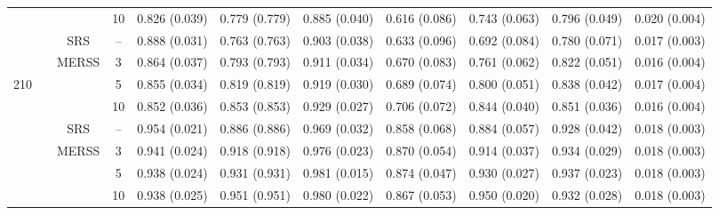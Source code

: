 \documentclass[twoside]{article}
\begin{document}
\begin{table}[!htb]
{\begin{tabular}{c c c c c c c c c c c}
    &                      &                                          &  10   &
  0.826 (0.039) & 0.779 (0.779) & 0.885 (0.040) & 0.616 (0.086) & 0.743 (0.063) & 0.796 (0.049)& 0.020 (0.004)  \\

    
 \cmidrule(lr){2-11}
  &\multirow{9}{*}{ }  & 
   \multirow{1}{*}{SRS} & -- 
 &0.888 (0.031) & 0.763 (0.763) & 0.903 (0.038) & 0.633 (0.096) & 0.692 (0.084) & 0.780 (0.071)& 0.017 (0.003)  \\
    
    \cmidrule(lr){3-11}
    &                      & \multirow{3}{*}{MERSS}   &  3   & 
  0.864 (0.037) & 0.793 (0.793) & 0.911 (0.034) & 0.670 (0.083) & 0.761 (0.062) & 0.822 (0.051)& 0.016 (0.004)  \\

  210 &          0.5            &                                          &  5    &
   0.855 (0.034) & 0.819 (0.819) & 0.919 (0.030) & 0.689 (0.074) & 0.800 (0.051) & 0.838 (0.042)& 0.017 (0.004)  \\

    &                      &                                          &  10   &
    0.852 (0.036) & 0.853 (0.853) & 0.929 (0.027) & 0.706 (0.072) & 0.844 (0.040) & 0.851 (0.036)& 0.016 (0.004)  \\


    \cmidrule(lr){2-11}
 &\multirow{9}{*}{ }  & 
    \multirow{1}{*}{SRS} & -- 
 &0.954 (0.021) & 0.886 (0.886) & 0.969 (0.032) & 0.858 (0.068) & 0.884 (0.057) & 0.928 (0.042)& 0.018 (0.003)  \\
    
    \cmidrule(lr){3-11}
    &                      & \multirow{3}{*}{MERSS}   &  3   & 
    0.941 (0.024) & 0.918 (0.918) & 0.976 (0.023) & 0.870 (0.054) & 0.914 (0.037) & 0.934 (0.029)& 0.018 (0.003)  \\

    &               0.7       &                                          &  5    &
  0.938 (0.024) & 0.931 (0.931) & 0.981 (0.015) & 0.874 (0.047) & 0.930 (0.027) & 0.937 (0.023)& 0.018 (0.003)  \\

    &                      &                                          &  10   &
   0.938 (0.025) & 0.951 (0.951) & 0.980 (0.022) & 0.867 (0.053) & 0.950 (0.020) & 0.932 (0.028)& 0.018 (0.003)  \\


\end{tabular}}
\end{table}
\end{document}
